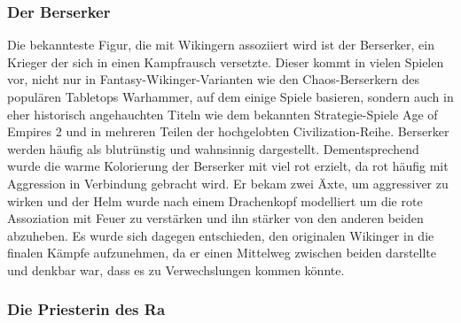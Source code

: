 \documentclass[extern,palatino]{cgBA}
\begin{document}
\subsubsection{Der Berserker}
Die bekannteste Figur, die mit Wikingern assoziiert wird ist der Berserker, ein Krieger der sich in einen Kampfrausch versetzte. Dieser kommt in vielen Spielen vor, nicht nur in Fantasy-Wikinger-Varianten wie den Chaos-Berserkern des populären Tabletops Warhammer, auf dem einige Spiele basieren, sondern auch in eher historisch angehauchten Titeln wie dem bekannten Strategie-Spiele Age of Empires 2 und in mehreren Teilen der hochgelobten  Civilization-Reihe. Berserker werden häufig als blutrünstig und wahnsinnig dargestellt. Dementsprechend wurde die warme Kolorierung der Berserker mit viel rot erzielt, da rot häufig mit Aggression in Verbindung gebracht wird. Er bekam zwei Äxte, um aggressiver zu wirken und der Helm wurde nach einem Drachenkopf modelliert um die rote Assoziation mit Feuer zu verstärken und ihn stärker von den anderen beiden abzuheben. Es wurde sich dagegen entschieden, den originalen Wikinger in die finalen Kämpfe aufzunehmen, da er einen Mittelweg zwischen beiden darstellte und denkbar war, dass es zu Verwechslungen kommen könnte.
\newpage
\subsubsection{Die Priesterin des Ra}
\end{document}
